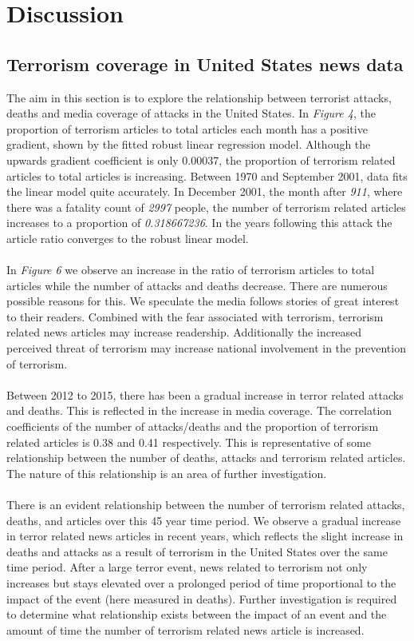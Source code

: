 \documentclass[10pt,a4paper]{article}
\begin{document}
\section{Discussion} 

\subsection{Terrorism coverage in United States news data}
The aim in this section is to explore the relationship between terrorist attacks, deaths and media coverage of attacks in the United States. In \textit{Figure 4}, the proportion of terrorism articles to total articles each month has a positive gradient, shown by the fitted robust linear regression model. Although the upwards gradient coefficient is only 0.00037, the proportion of terrorism related articles to total articles is increasing. Between 1970 and September 2001, data fits the linear model quite accurately. In December 2001, the month after \textit{911}, where there was a fatality count of \textit{2997} people, the number of terrorism related articles increases to a proportion of \textit{0.318667236}. In the years following this attack the article ratio converges to the robust linear model.
\\\\
In \textit{Figure 6} we observe an increase in the ratio of terrorism articles to total articles while the number of attacks and deaths decrease. There are numerous possible reasons for this. We speculate the media follows stories of great interest to their readers. Combined with the fear associated with terrorism, terrorism related news articles may increase readership. Additionally the increased perceived threat of terrorism may increase national involvement in the prevention of terrorism.
\\\\
Between 2012 to 2015, there has been a gradual increase in terror related attacks and deaths. This is reflected in the increase in media coverage. 
The correlation coefficients of the number of attacks/deaths and the proportion of terrorism related articles is 0.38 and 0.41 respectively. 
This is representative of some relationship between the number of deaths, attacks and terrorism related articles.
The nature of this relationship is an area of further investigation.
\\\\ 
There is an evident relationship between the number of terrorism related attacks, deaths, and articles over this 45 year time period.
We observe a gradual increase in terror related news articles in recent years, which reflects the slight increase in deaths and attacks as a result of terrorism in the United States over the same time period.
After a large terror event, news related to terrorism not only increases but stays elevated over a prolonged period of time proportional to the impact of the event (here measured in deaths). 
Further investigation is required to determine what relationship exists between the impact of an event and the amount of time the number of terrorism related news article is increased.
\end{document}
